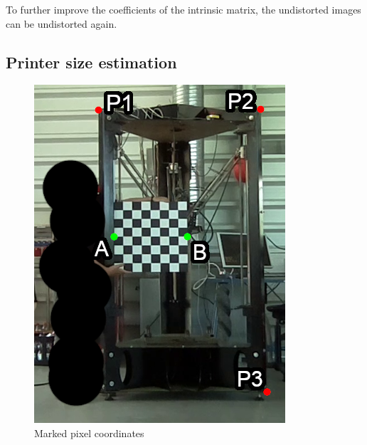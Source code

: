 \begin{minipage}{\textwidth}
To further improve the coefficients of the intrinsic matrix, the undistorted images can be undistorted again.
\end{minipage}

\newpage



\subsection{Printer size estimation}

\begin{figure}
    \vspace{-.75\baselineskip}
    \centering
     \captionsetup{justification=centering}
     \begin{minipage}[b]{0.45\textwidth}
         \centering
         \includegraphics[width=\textwidth]{image/2/metal_printer_size.png}
         \caption{Marked pixel coordinates}
         \label{fig:printer_size}\par
     \end{minipage}
\end{figure}

